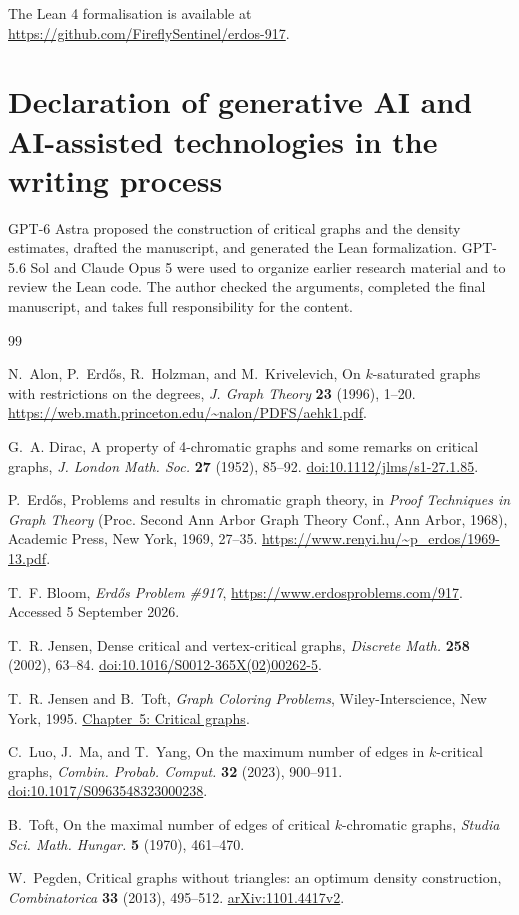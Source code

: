 \documentclass[11pt]{article}
\numberwithin{equation}{section}
\begin{document}
The Lean 4 formalisation is available at
\url{https://github.com/FireflySentinel/erdos-917}.

\section*{Declaration of generative AI and AI-assisted technologies in the writing process}

GPT-6 Astra proposed the construction of critical graphs and the
density estimates, drafted the manuscript, and generated the Lean formalization.
GPT-5.6 Sol and Claude Opus 5 were used to organize earlier research material
and to review the Lean code.
The author checked the arguments, completed the final manuscript, and takes
full responsibility for the content.

\begin{thebibliography}{99}

N.~Alon, P.~Erd\H{o}s, R.~Holzman, and M.~Krivelevich,
On \(k\)-saturated graphs with restrictions on the degrees,
\emph{J. Graph Theory} \textbf{23} (1996), 1--20.
\url{https://web.math.princeton.edu/~nalon/PDFS/aehk1.pdf}.

G.~A. Dirac,
A property of 4-chromatic graphs and some remarks on critical graphs,
\emph{J. London Math. Soc.} \textbf{27} (1952), 85--92.
\href{https://doi.org/10.1112/jlms/s1-27.1.85}{doi:10.1112/jlms/s1-27.1.85}.

P.~Erd\H{o}s,
Problems and results in chromatic graph theory,
in \emph{Proof Techniques in Graph Theory}
(Proc. Second Ann Arbor Graph Theory Conf., Ann Arbor, 1968),
Academic Press, New York, 1969, 27--35.
\url{https://www.renyi.hu/~p_erdos/1969-13.pdf}.

T.~F. Bloom,
\emph{Erd\H{o}s Problem \#917},
\url{https://www.erdosproblems.com/917}.
Accessed 5 September 2026.

T.~R. Jensen,
Dense critical and vertex-critical graphs,
\emph{Discrete Math.} \textbf{258} (2002), 63--84.
\href{https://doi.org/10.1016/S0012-365X(02)00262-5}{doi:10.1016/S0012-365X(02)00262-5}.

T.~R. Jensen and B.~Toft,
\emph{Graph Coloring Problems},
Wiley-Interscience, New York, 1995.
\href{https://doi.org/10.1002/9781118032497.ch5}{Chapter~5: Critical graphs}.

C.~Luo, J.~Ma, and T.~Yang,
On the maximum number of edges in \(k\)-critical graphs,
\emph{Combin. Probab. Comput.} \textbf{32} (2023), 900--911.
\href{https://doi.org/10.1017/S0963548323000238}{doi:10.1017/S0963548323000238}.

B.~Toft,
On the maximal number of edges of critical \(k\)-chromatic graphs,
\emph{Studia Sci. Math. Hungar.} \textbf{5} (1970), 461--470.

W.~Pegden,
Critical graphs without triangles: an optimum density construction,
\emph{Combinatorica} \textbf{33} (2013), 495--512.
\href{https://arxiv.org/abs/1101.4417v2}{arXiv:1101.4417v2}.

\end{thebibliography}
\end{document}

